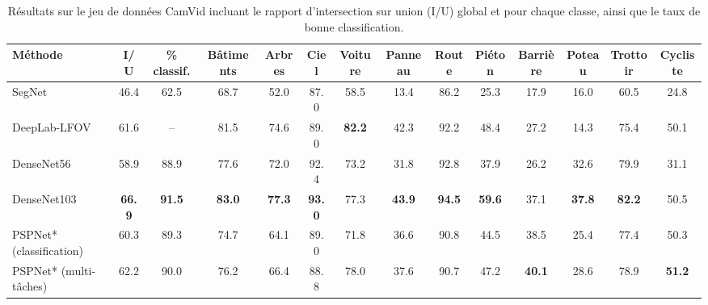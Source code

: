 \begin{table*}[!t]
\setlength{\tabcolsep}{1pt}
\begin{tabularx}{\textwidth}{Y c c c c c c c c c c c c c}
\toprule
Méthode & I/U & \% classif. & Bâtiments & Arbres & Ciel & Voiture & Panneau & Route & Piéton & Barrière & Poteau & Trottoir & Cycliste\\
\midrule
SegNet~\cite{badrinarayanan_segnet:_2017} & 46.4 & 62.5 & 68.7 & 52.0 & 87.0 & 58.5 & 13.4 & 86.2 & 25.3 & 17.9 & 16.0 & 60.5 & 24.8\\
DeepLab-LFOV~\cite{l._c._chen_deeplab:_2017} & 61.6 & -- & 81.5 & 74.6 & 89.0 & \textbf{82.2} & 42.3 & 92.2 & 48.4 & 27.2 & 14.3 & 75.4 & 50.1\\
DenseNet56~\cite{jegou_one_2017} & 58.9 & 88.9 & 77.6 & 72.0 & 92.4 & 73.2 & 31.8 & 92.8 & 37.9 & 26.2 & 32.6 & 79.9 & 31.1\\
DenseNet103~\cite{jegou_one_2017} & \textbf{66.9} & \textbf{91.5} & \textbf{83.0} & \textbf{77.3} & \textbf{93.0} & 77.3 & \textbf{43.9} & \textbf{94.5} & \textbf{59.6} & 37.1 & \textbf{37.8} & \textbf{82.2} & 50.5\\
\midrule
PSPNet* (classification) & 60.3 & 89.3 & 74.7 & 64.1 & 89.0 & 71.8 & 36.6 & 90.8 & 44.5 & 38.5 & 25.4 & 77.4 & 50.3\\
PSPNet* (multi-tâches) & 62.2 & 90.0 & 76.2 & 66.4 &  88.8 & 78.0 & 37.6 & 90.7 & 47.2 & \textbf{40.1} & 28.6 & 78.9 & \textbf{51.2}\\
\bottomrule
\end{tabularx}
\caption{Résultats sur le jeu de données CamVid incluant le rapport d'intersection sur union (I/U) global et pour chaque classe, ainsi que le taux de bonne classification.}
\label{tab:camvid_results}
\end{table*}

